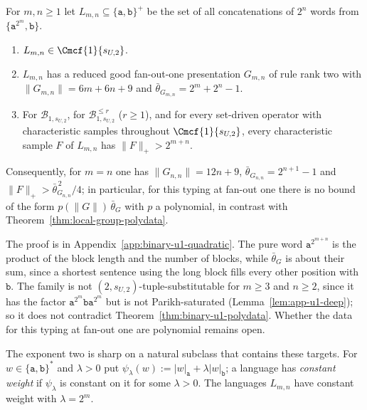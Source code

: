 \begin{proposition}
\label{prop:binary-u1-quadratic}
For $m,n\ge1$ let $L_{m,n}\subseteq\{\mathtt a,\mathtt b\}^+$ be the set of all
concatenations of $2^n$ words from $\{\mathtt a^{2^m},\mathtt b\}$.
\begin{enumerate}[label=\textup{(\roman*)},leftmargin=*]
\item $L_{m,n}\in\Cmcf{1}{s_{U,2}}$.
\item $L_{m,n}$ has a reduced good fan-out-one presentation $G_{m,n}$ of rule rank
two with $\|G_{m,n}\|=6m+6n+9$ and $\bar\theta_{G_{m,n}}=2^m+2^n-1$.
\item For $\mathcal B_{1,s_{U,2}}$, for $\mathcal B^{\le r}_{1,s_{U,2}}$ \textup($r\ge1$\textup),
and for every set-driven operator with characteristic samples throughout
$\Cmcf{1}{s_{U,2}}$, every characteristic sample $F$ of $L_{m,n}$ has
$\|F\|_+>2^{m+n}$.
\end{enumerate}
Consequently, for $m=n$ one has $\|G_{n,n}\|=12n+9$, $\bar\theta_{G_{n,n}}=2^{n+1}-1$
and $\|F\|_+>\bar\theta_{G_{n,n}}^{\,2}/4$; in particular, for this typing at
fan-out one there is no bound of the form $p(\|G\|)\,\bar\theta_G$ with $p$ a
polynomial, in contrast with Theorem~\ref{thm:local-group-polydata}.
\end{proposition}

The proof is in Appendix~\ref{app:binary-u1-quadratic}.  The pure word
$\mathtt a^{2^{m+n}}$ is the product of the block length and the number of
blocks, while $\bar\theta_G$ is about their sum, since a shortest sentence using
the long block fills every other position with $\mathtt b$.  The family is not
$(2,s_{U,2})$-tuple-substitutable for $m\ge3$ and $n\ge2$, since it has the factor
$\mathtt a^{2^m}\mathtt b\mathtt a^{2^m}$ but is not Parikh-saturated
(Lemma~\ref{lem:app-u1-deep}); so it does not contradict
Theorem~\ref{thm:binary-u1-polydata}.  Whether the data for this typing at
fan-out one are polynomial remains open.

The exponent two is sharp on a natural subclass that contains these targets.
For $w\in\{\mathtt a,\mathtt b\}^*$ and $\lambda>0$ put
$\psi_\lambda(w):=|w|_{\mathtt a}+\lambda|w|_{\mathtt b}$; a language has
\emph{constant weight} if $\psi_\lambda$ is constant on it for some $\lambda>0$.
The languages $L_{m,n}$ have constant weight with $\lambda=2^m$.

